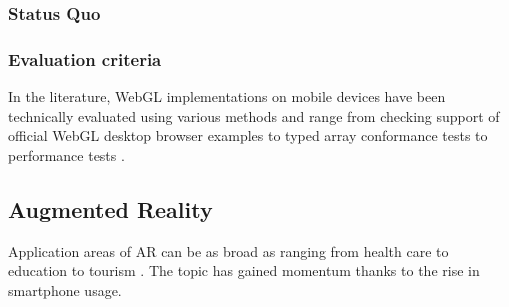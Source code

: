 \documentclass[12pt,journal,compsoc]{IEEEtran}
\begin{document}




\subsubsection{Status Quo}

\subsubsection{Evaluation criteria}
In the literature, WebGL implementations on mobile devices have been technically evaluated using various methods and range from checking support of official WebGL desktop browser examples to typed array conformance tests to performance tests \cite{Golubovic2011}. 

\subsection{Augmented Reality}

Application areas of AR can be as broad as ranging from health care \cite{Lui2011} to education \cite{Mannuss2011} to tourism \cite{Mulloni2011}. The topic has gained momentum thanks to the rise in smartphone usage.

\end{document}
